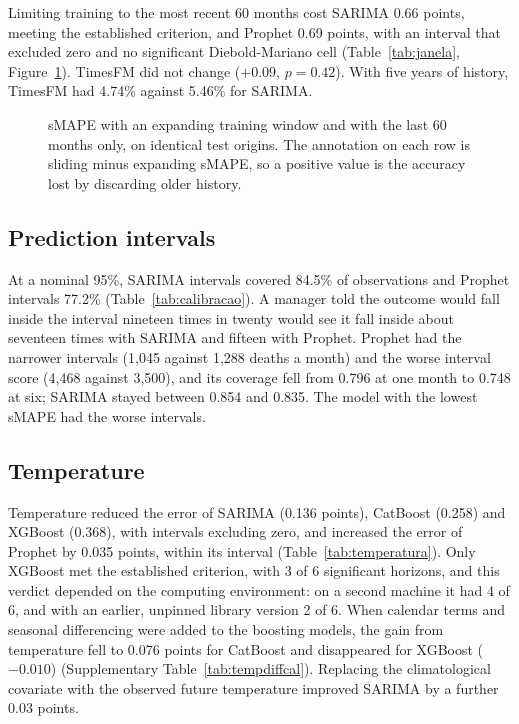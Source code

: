 

Limiting training to the most recent 60 months cost SARIMA 0.66 points, meeting the
established criterion, and Prophet 0.69 points, with an interval that excluded zero and no
significant Diebold-Mariano cell (Table~\ref{tab:janela}, Figure~\ref{fig:janela}). TimesFM
did not change ($+0.09$, $p=0.42$). With five years of history, TimesFM had 4.74\% against
5.46\% for SARIMA.

\begin{figure}[htbp]
\centering

\caption{sMAPE with an expanding training window and with the last 60 months only, on
identical test origins. The annotation on each row is sliding minus expanding sMAPE, so a
positive value is the accuracy lost by discarding older history.}
\label{fig:janela}
\end{figure}

\subsection{Prediction intervals}



At a nominal 95\%, SARIMA intervals covered 84.5\% of observations and Prophet intervals
77.2\% (Table~\ref{tab:calibracao}). A manager told the outcome would fall inside the
interval nineteen times in twenty would see it fall inside about seventeen times with SARIMA
and fifteen with Prophet. Prophet had the narrower intervals (1{,}045 against 1{,}288 deaths
a month) and the worse interval score (4{,}468 against 3{,}500), and its coverage fell from
0.796 at one month to 0.748 at six; SARIMA stayed between 0.854 and 0.835. The model with
the lowest sMAPE had the worse intervals.

\subsection{Temperature}



Temperature reduced the error of SARIMA (0.136 points), CatBoost (0.258) and XGBoost
(0.368), with intervals excluding zero, and increased the error of Prophet by 0.035 points,
within its interval (Table~\ref{tab:temperatura}). Only XGBoost met the established
criterion, with 3 of 6 significant horizons, and this verdict depended on the computing
environment: on a second machine it had 4 of 6, and with an earlier, unpinned library
version 2 of 6. When calendar terms and seasonal differencing were added to the boosting
models, the gain from temperature fell to 0.076 points for CatBoost and disappeared for
XGBoost ($-0.010$) (Supplementary Table~\ref{tab:tempdiffcal}). Replacing the climatological
covariate with the observed future temperature improved SARIMA by a further 0.03 points.

